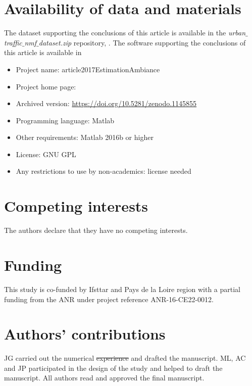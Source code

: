 \documentclass[twocolumn]{svjour3}          %
\providecommand{\DIFaddtex}[1]{{\protect\color{blue}\uwave{#1}}} %
\providecommand{\DIFdeltex}[1]{{\protect\color{red}\sout{#1}}}                      %
\providecommand{\DIFaddbegin}{} %
\providecommand{\DIFaddend}{} %
\providecommand{\DIFdelbegin}{} %
\providecommand{\DIFdelend}{} %
\providecommand{\DIFadd}[1]{\texorpdfstring{\DIFaddtex{#1}}{#1}} %
\providecommand{\DIFdel}[1]{\texorpdfstring{\DIFdeltex{#1}}{}} %
\begin{document}
\section*{Availability of data and materials}
The dataset supporting the conclusions of this article is available in the \textit{urban$\_$traffic$\_$nmf$\_$dataset.zip}  repository,  \sloppy {}.
The software supporting the conclusions of this article is available in

 \begin{itemize} 
\item Project name: article2017EstimationAmbiance
\item \sloppy Project home page: 
\item Archived version: \url{https://doi.org/10.5281/zenodo.1145855}
\item Programming language: Matlab
\item Other requirements: Matlab 2016b or higher
\item License: GNU GPL
\item Any restrictions to use by non-academics: license needed
 \end{itemize} 


\section*{Competing interests}
The authors declare that they have no competing interests.

\section*{Funding}
This study is co-funded by Ifsttar and Pays de la Loire region with a partial funding from the ANR under project reference ANR-16-CE22-0012.

\section*{Authors' contributions}
JG carried out the numerical \DIFdelbegin \DIFdel{experience }\DIFdelend \DIFaddbegin \DIFadd{experiment }\DIFaddend and drafted the manuscript. ML, AC and JP participated in the design of the study and helped to draft the manuscript.
All authors read and approved the final manuscript.


\end{document}
